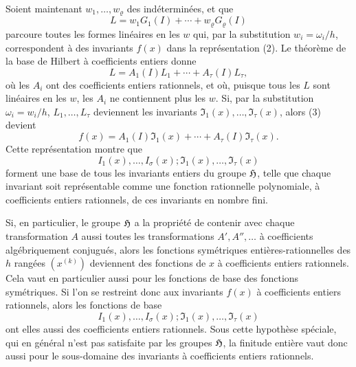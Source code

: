 Soient maintenant $w_1,\ldots,w_\varrho$ des indéterminées, et que
\[
        L=w_1G_1(I)+\cdots+w_\varrho G_\varrho(I)
\]
parcoure toutes les formes linéaires en les $w$ qui, par la substitution $w_i=\omega_i/h$, correspondent à des invariants $f(x)$ dans la représentation (2). Le théorème de la base de Hilbert à coefficients entiers donne
\begin{equation}
        L=A_1(I)L_1+\cdots+A_\tau(I)L_\tau,
\end{equation}
où les $A_i$ ont des coefficients entiers rationnels, et où, puisque tous les $L$ sont linéaires en les $w$, les $A_i$ ne contiennent plus les $w$. Si, par la substitution $\omega_i=w_i/h$, $L_1,\ldots,L_\tau$ deviennent les invariants $\mathfrak I_1(x),\ldots,\mathfrak I_\tau(x)$, alors (3) devient
\begin{equation}
        f(x)=A_1(I)\mathfrak I_1(x)+\cdots+A_\tau(I)\mathfrak I_\tau(x).
\end{equation}
Cette représentation montre que
\[
        I_1(x),\ldots,I_\sigma(x);\mathfrak I_1(x),\ldots,\mathfrak I_\tau(x)
\]
forment une base de tous les invariants entiers du groupe $\mathfrak H$, telle que chaque invariant soit représentable comme une fonction rationnelle polynomiale, à coefficients entiers rationnels, de ces invariants en nombre fini.

Si, en particulier, le groupe $\mathfrak H$ a la propriété de contenir avec chaque transformation $A$ aussi toutes les transformations $A',A'',\ldots$ à coefficients algébriquement conjugués, alors les fonctions symétriques entières-rationnelles des $h$ rangées $(x^{(k)})$ deviennent des fonctions de $x$ à coefficients entiers rationnels. Cela vaut en particulier aussi pour les fonctions de base des fonctions symétriques. Si l'on se restreint donc aux invariants $f(x)$ à coefficients entiers rationnels, alors les fonctions de base
\[
        I_1(x),\ldots,I_\sigma(x);\mathfrak I_1(x),\ldots,\mathfrak I_\tau(x)
\]
ont elles aussi des coefficients entiers rationnels. Sous cette hypothèse spéciale, qui en général n'est pas satisfaite par les groupes $\mathfrak H$, la finitude entière vaut donc aussi pour le sous-domaine des invariants à coefficients entiers rationnels.
